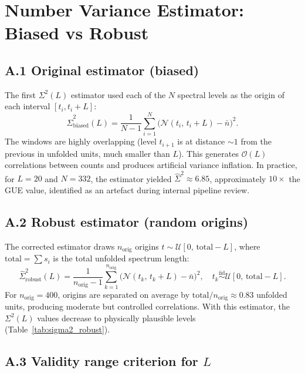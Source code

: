 \documentclass[12pt, a4paper]{article}
\begin{document}
\appendix
\section{Number Variance Estimator: Biased vs Robust}
\label{app:estimator}

\subsection*{A.1 Original estimator (biased)}

The first $\Sigma^2(L)$ estimator used each of the $N$ spectral levels
as the origin of each interval $[t_i, t_i + L]$:
\[
  \hat{\Sigma}^2_\text{biased}(L)
    = \frac{1}{N-1}\sum_{i=1}^{N}\bigl(\mathcal{N}(t_i,\,t_i+L) - \bar{n}\bigr)^2.
\]
The windows are highly overlapping (level $t_{i+1}$ is at distance $\sim 1$
from the previous in unfolded units, much smaller than $L$).
This generates $\mathcal{O}(L)$ correlations between counts and produces
artificial variance inflation. In practice, for $L = 20$ and $N = 332$,
the estimator yielded $\hat{\Sigma}^2 \approx 6.85$,
approximately $10\times$ the GUE value, identified as an artefact
during internal pipeline review.

\subsection*{A.2 Robust estimator (random origins)}

The corrected estimator draws $n_\text{orig}$ origins
$t \sim \mathcal{U}[0,\, \text{total} - L]$, where
$\text{total} = \sum s_i$ is the total unfolded spectrum length:
\[
  \hat{\Sigma}^2_\text{robust}(L)
    = \frac{1}{n_\text{orig}-1}
      \sum_{k=1}^{n_\text{orig}}
      \bigl(\mathcal{N}(t_k,\,t_k+L) - \bar{n}\bigr)^2,
  \quad t_k \overset{\text{iid}}{\sim} \mathcal{U}[0,\,\text{total}-L].
\]
For $n_\text{orig} = 400$, origins are separated on average by
$\text{total}/n_\text{orig} \approx 0.83$ unfolded units, producing
moderate but controlled correlations. With this estimator, the $\Sigma^2(L)$
values decrease to physically plausible levels
(Table~\ref{tab:sigma2_robust}).

\subsection*{A.3 Validity range criterion for $L$}
\end{document}
